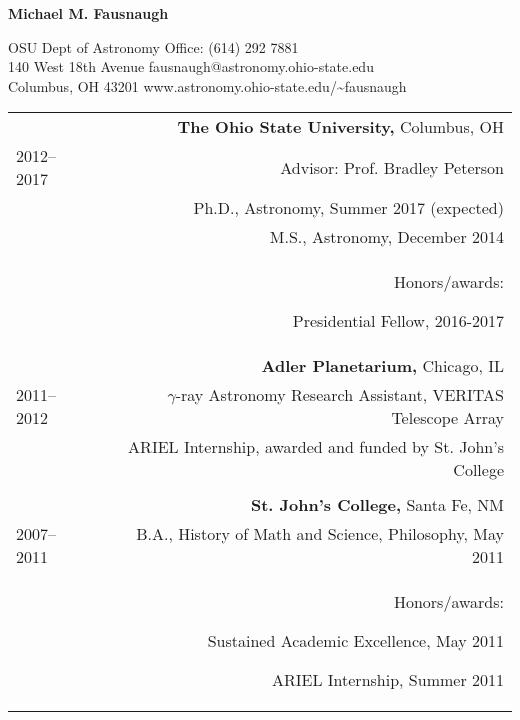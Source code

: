 \documentclass[letterpaper,12pt]{article}
\begin{document}
\begin{center}
\huge\bfseries{Michael M. Fausnaugh}
\end{center}

\noindent OSU Dept of Astronomy \hfill Office: (614) 292 7881 \\
140 West 18th Avenue  \hfill fausnaugh@astronomy.ohio-state.edu \\
Columbus, OH 43201    \hfill  www.astronomy.ohio-state.edu/\textasciitilde fausnaugh

%

\vspace{2em}
\begin{longtable}{LR}

\underline{} &     

\textbf{The Ohio State University,} Columbus, OH\\
2012--2017   &    Advisor:  Prof. Bradley Peterson\\
&Ph.D., Astronomy, Summer 2017 (expected)\\
&    M.S.,  Astronomy, December 2014\\
&    Honors/awards:
\begin{compactitem}
\item Presidential Fellow, 2016-2017
\end{compactitem}

\\

&\textbf{Adler Planetarium,} Chicago, IL\\
2011--2012&    $\gamma$-ray Astronomy Research Assistant, VERITAS Telescope Array\\
&  ARIEL Internship, awarded and funded by St. John's College \\

\\
&\textbf{St. John's College,} Santa Fe, NM\\
2007--2011&B.A., History of Math and Science, Philosophy,  May 2011\\
&Honors/awards: 
\begin{compactitem} 
\item Sustained Academic Excellence, May 2011
\item  ARIEL Internship, Summer 2011
\end{compactitem}
\\





\end{longtable}
\end{document}
